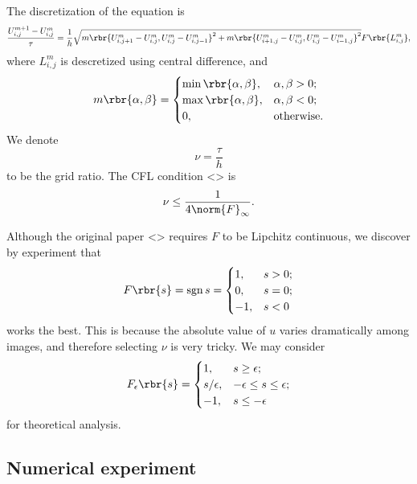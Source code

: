 \documentclass[english, nochinese]{pnote}
\DeclareMathOperator\opsgn{\mathrm{sgn}}
\begin{document}
The discretization of the equation is
\begin{equation}
\frac{ U_{ i, j }^{ m + 1 } - U_{ i, j }^m }{\tau} = \frac{1}{h} \sqrt{ m \rbr{ U_{ i, j + 1 }^m - U_{ i, j }^m, U_{ i, j }^m - U_{ i, j - 1 }^m }^2 + m \rbr{ U_{ i + 1, j }^m - U_{ i, j }^m, U_{ i, j }^m - U_{ i - 1, j }^m }^2 } F \rbr{L_{ i, j }^m},
\end{equation}
where $ L_{ i, j }^m $ is descretized using central difference, and
\begin{equation}
m \rbr{ \alpha, \beta } =
\begin{cases}
\min \rbr{ \alpha, \beta }, & \alpha, \beta > 0; \\
\max \rbr{ \alpha, \beta }, & \alpha, \beta < 0; \\
0, & \text{otherwise}.
\end{cases}
\end{equation}
We denote
\begin{equation}
\nu = \frac{\tau}{h}
\end{equation}
to be the grid ratio. The CFL condition <> is
\begin{equation}
\nu \le \frac{1}{ 4 \norm{F}_{\infty} }.
\end{equation}

Although the original paper <> requires $F$ to be Lipchitz continuous, we discover by experiment that
\begin{equation}
F \rbr{s} = \opsgn s =
\begin{cases}
1, & s > 0; \\
0, & s = 0; \\
-1, & s < 0
\end{cases}
\end{equation}
works the best. This is because the absolute value of $u$ varies dramatically among images, and therefore selecting $\nu$ is very tricky. We may consider
\begin{equation}
F_{\epsilon} \rbr{s} =
\begin{cases}
1, & s \ge \epsilon; \\
s / \epsilon, & -\epsilon \le s \le \epsilon; \\
-1, & s \le -\epsilon
\end{cases}
\end{equation}
for theoretical analysis.

\subsection{Numerical experiment}
\end{document}
